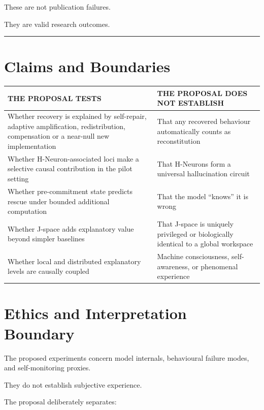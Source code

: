 These are not publication failures.

They are valid research outcomes.

\begin{center}\rule{0.5\linewidth}{0.5pt}\end{center}

\section*{Claims and Boundaries}
\begin{center}
\renewcommand{\arraystretch}{1.35}
\begin{tabularx}{\textwidth}{>{\raggedright\arraybackslash}X >{\raggedright\arraybackslash}X}
\toprule
\textbf{THE PROPOSAL TESTS} & \textbf{THE PROPOSAL DOES NOT ESTABLISH} \\
\midrule
Whether recovery is explained by self-repair, adaptive amplification, redistribution, compensation or a near-null new implementation & That any recovered behaviour automatically counts as reconstitution \\
Whether H-Neuron-associated loci make a selective causal contribution in the pilot setting & That H-Neurons form a universal hallucination circuit \\
Whether pre-commitment state predicts rescue under bounded additional computation & That the model ``knows'' it is wrong \\
Whether J-space adds explanatory value beyond simpler baselines & That J-space is uniquely privileged or biologically identical to a global workspace \\
Whether local and distributed explanatory levels are causally coupled & Machine consciousness, self-awareness, or phenomenal experience \\
\bottomrule
\end{tabularx}
\end{center}


\section{Ethics and Interpretation Boundary}\label{ethics-and-interpretation-boundary}

The proposed experiments concern model internals, behavioural failure modes, and self-monitoring proxies.

They do not establish subjective experience.

The proposal deliberately separates:

